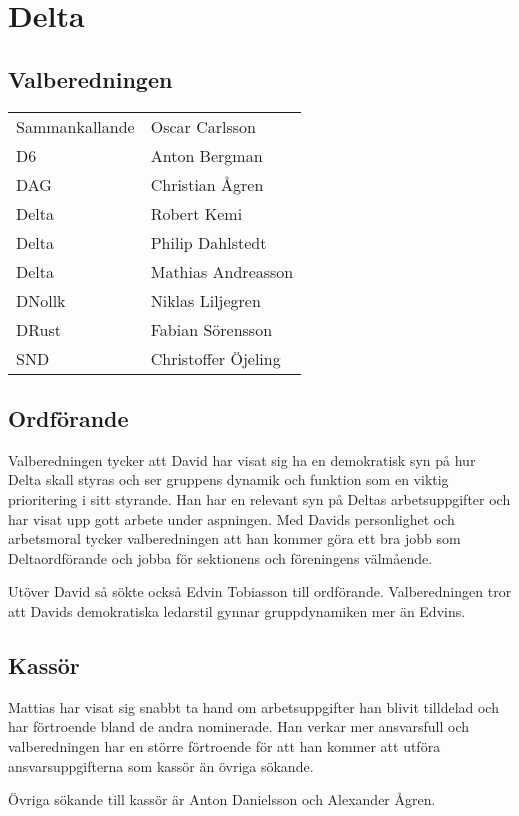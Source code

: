 \section{Delta}

\subsection{Valberedningen}
\begin{autoframe}

\begin{tabular}{ll}
Sammankallande & Oscar Carlsson \\
D6 & Anton Bergman \\
DAG  & Christian Ågren \\
Delta  & Robert Kemi \\
Delta  & Philip Dahlstedt \\
Delta  & Mathias Andreasson \\
DNollk & Niklas Liljegren \\
DRust & Fabian Sörensson \\
SND  & Christoffer Öjeling
\end{tabular}

\end{autoframe}

\subsection{Ordförande}
\begin{autoframe}

Valberedningen tycker att David har visat sig ha en demokratisk syn på hur Delta skall styras och ser gruppens dynamik och funktion som en viktig prioritering i sitt styrande. Han har en relevant syn på Deltas arbetsuppgifter och har visat upp gott arbete under aspningen. Med Davids personlighet och arbetsmoral tycker valberedningen att han kommer göra ett bra jobb som Deltaordförande och jobba för sektionens och föreningens välmående.
\bigskip

Utöver David så sökte också Edvin Tobiasson till ordförande. Valberedningen tror att Davids demokratiska ledarstil gynnar gruppdynamiken mer än Edvins.
\end{autoframe}

\subsection{Kassör}
\begin{autoframe}

Mattias har visat sig snabbt ta hand om arbetsuppgifter han blivit tilldelad och har förtroende bland de andra nominerade. Han verkar mer ansvarsfull och valberedningen har en större förtroende för att han kommer att utföra ansvarsuppgifterna som kassör än övriga sökande.

\bigskip
Övriga sökande till kassör är Anton Danielsson och Alexander Ågren.
\end{autoframe}


